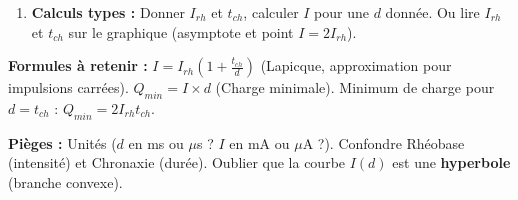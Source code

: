 \documentclass[11pt]{article}
\begin{document}
\begin{methode}
\begin{enumerate}
\begin{itemize}
        \item \textbf{Chronaxie ($t_{ch}$) :} Durée \textbf{minimale} pour exciter avec une intensité **$2 \times I_{rh}$\textbf{. Reflète la }constante de temps membranaire** ($\tau_m = R_m C_m$) et la cinétique d'ouverture des canaux . Unité : \SI{}{\micro s} ou \SI{}{ms}.
        \item \textbf{Interprétation physiologique :}
            \begin{itemize}
                \item Courte chronaxie (\SI{< 100}{\micro s}) = Fibres \textbf{myélinisées} (grosses, $\tau_m$ faible, canaux  denses aux nœuds, réponse rapide). Ex: Fibres motrices $\alpha$, A$\alpha$ (\SI{50-100}{\micro s}).
                \item Longue chronaxie (\SI{> 1}{ms}) = Fibres \textbf{amylinisées} (fines, $\tau_m$ forte, canaux  diffus, réponse lente). Ex: Fibres C (douleur diffuse) \SI{0.4-1}{ms}.
            \end{itemize}
    \end{itemize}
    \item \textbf{Calculs types :} Donner $I_{rh}$ et $t_{ch}$, calculer $I$ pour une $d$ donnée. Ou lire $I_{rh}$ et $t_{ch}$ sur le graphique (asymptote et point $I=2I_{rh}$).
\end{enumerate}

\textbf{Formules à retenir :}
$I = I_{rh} \left( 1 + \frac{t_{ch}}{d} \right)$  (Lapicque, approximation pour impulsions carrées).
$Q_{min} = I \times d$ (Charge minimale). Minimum de charge pour $d = t_{ch}$ : $Q_{min} = 2 I_{rh} t_{ch}$.

\textbf{Pièges :} Unités ($d$ en ms ou $\mu$s ? $I$ en mA ou $\mu$A ?). Confondre Rhéobase (intensité) et Chronaxie (durée). Oublier que la courbe $I(d)$ est une \textbf{hyperbole} (branche convexe).
\end{methode}
\end{document}
